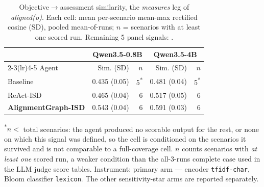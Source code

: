 
\begin{table}[t]
  \caption{Objective$\to$assessment similarity, the \emph{measures} leg of \textit{aligned(o)}. Each cell: mean per-scenario mean-max rectified cosine (SD), pooled mean-of-runs; $n$ = scenarios with at least one scored run. Remaining 5 panel signals: .}
  \label{tab:rq2-alignment}
  \small
  \begin{tabular}{@{}lr@{\hskip 3pt}rr@{\hskip 3pt}r@{}}
    \toprule
    & \multicolumn{2}{c}{Qwen3.5-0.8B} & \multicolumn{2}{c}{Qwen3.5-4B} \\
    \cmidrule(lr){2-3}\cmidrule(lr){4-5}
    Agent & Sim. (SD) & $n$ & Sim. (SD) & $n$ \\
    \midrule
    Baseline & 0.435 (0.05) & 5\textsuperscript{*} & 0.481 (0.04) & 5\textsuperscript{*} \\
    ReAct-ISD & 0.465 (0.04) & 6 & 0.517 (0.05) & 6 \\
    \textbf{AlignmentGraph-ISD} & 0.543 (0.04) & 6 & 0.591 (0.03) & 6 \\
    \bottomrule
  \end{tabular}
  \par\smallskip\footnotesize \textsuperscript{*}$n<$ total scenarios: the agent produced no scorable output for the rest, or none on which this signal was defined, so the cell is conditioned on the scenarios it survived and is not comparable to a full-coverage cell. $n$ counts scenarios with \emph{at least one} scored run, a weaker condition than the all-3-runs complete case used in the LLM judge score tables. Instrument: primary arm --- encoder \texttt{tfidf-char}, Bloom classifier \texttt{lexicon}. The other sensitivity-star arms are reported separately.
\end{table}
